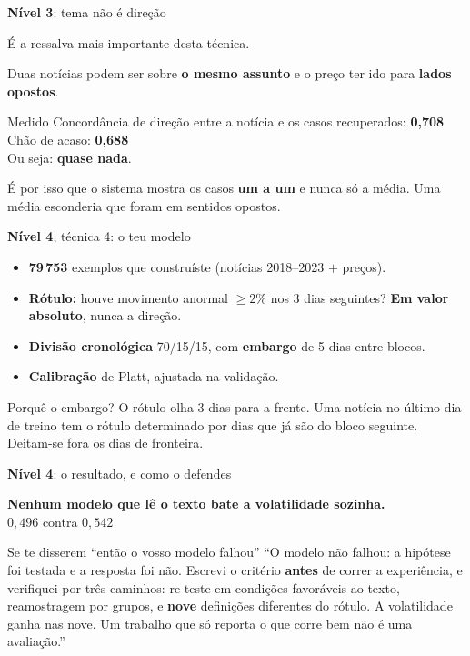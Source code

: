 \documentclass[aspectratio=169]{beamer}
\newcommand{\key}[1]{\textbf{\textcolor{blue!55!black}{#1}}}
\begin{document}
\begin{frame}{\key{Nível 3}: tema não é direção}
\begin{center}
\large É a ressalva mais importante desta técnica.
\end{center}
\vspace{4mm}
Duas notícias podem ser sobre \textbf{o mesmo assunto} e o preço ter ido para \textbf{lados
opostos}.
\vspace{3mm}
\begin{block}{Medido}
Concordância de direção entre a notícia e os casos recuperados: \key{0{,}708}\\
Chão de acaso: \key{0{,}688}\\[2mm]
Ou seja: \textbf{quase nada}.
\end{block}
\vspace{2mm}
\footnotesize
É por isso que o sistema mostra os casos \textbf{um a um} e nunca só a média. Uma média
esconderia que foram em sentidos opostos.
\end{frame}

\begin{frame}{\key{Nível 4}, técnica 4: o teu modelo}
\begin{itemize}
  \item \key{79\,753} exemplos que construíste (notícias 2018--2023 $+$ preços).
  \item \key{Rótulo:} houve movimento anormal $\ge 2\%$ nos 3 dias seguintes? \textbf{Em valor
        absoluto}, nunca a direção.
  \item \key{Divisão cronológica} 70/15/15, com \key{embargo} de 5 dias entre blocos.
  \item \key{Calibração} de Platt, ajustada na validação.
\end{itemize}
\vspace{3mm}
\begin{block}{Porquê o embargo?}
O rótulo olha 3 dias para a frente. Uma notícia no último dia de treino tem o rótulo determinado por
dias que já são do bloco seguinte. Deitam-se fora os dias de fronteira.
\end{block}
\end{frame}

\begin{frame}{\key{Nível 4}: o resultado, e como o defendes}
\begin{center}
\textbf{Nenhum modelo que lê o texto bate a volatilidade sozinha.}\\
$0{,}496$ contra $0{,}542$
\end{center}
\vspace{4mm}
\begin{block}{Se te disserem ``então o vosso modelo falhou''}
``O modelo não falhou: a hipótese foi testada e a resposta foi não. Escrevi o critério
\textbf{antes} de correr a experiência, e verifiquei por três caminhos: re-teste em condições
favoráveis ao texto, reamostragem por grupos, e \textbf{nove} definições diferentes do rótulo. A
volatilidade ganha nas nove. Um trabalho que só reporta o que corre bem não é uma avaliação.''
\end{block}
\end{frame}
\end{document}
